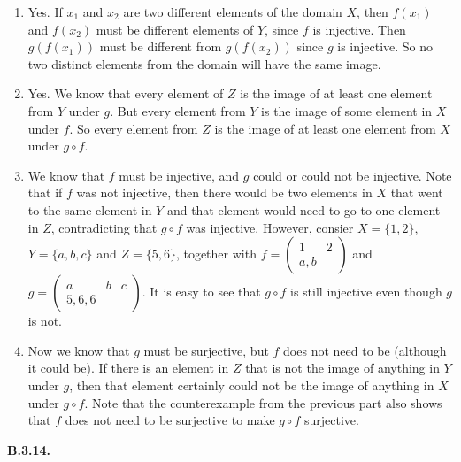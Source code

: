 \documentclass[10pt,]{book}
\theoremstyle{plain}
\theoremstyle{definition}
\theoremstyle{definition}
\theoremstyle{definition}
\theoremstyle{definition}
\numberwithin{equation}{chapter}
\newcommand{\twoline}[2]{\begin{pmatrix}#1 \\ #2 \end{pmatrix}}
\newcommand{\amp}{&}
\begin{document}
\begin{enumerate}[label=(\alph*)]
\item\hypertarget{li-633}{}\hypertarget{p-1872}{}%
Yes.  If \(x_1\) and \(x_2\) are two different elements of the domain \(X\), then \(f(x_1)\) and \(f(x_2)\) must be different elements of \(Y\), since \(f\) is injective.  Then \(g(f(x_1))\) must be different from \(g(f(x_2))\) since \(g\) is injective.  So no two distinct elements from the domain will have the same image.%
\item\hypertarget{li-634}{}\hypertarget{p-1873}{}%
Yes.  We know that every element of \(Z\) is the image of at least one element from \(Y\) under \(g\).  But every element from \(Y\) is the image of some element in \(X\) under \(f\).  So every element from \(Z\) is the image of at least one element from \(X\) under \(g\circ f\).%
\item\hypertarget{li-635}{}\hypertarget{p-1874}{}%
We know that \(f\) must be injective, and \(g\) could or could not be injective. Note that if \(f\) was not injective, then there would be two elements in \(X\) that went to the same element in \(Y\) and that element would need to go to one element in \(Z\), contradicting that \(g\circ f\) was injective. However, consier \(X = \{1,2\}\), \(Y = \{a, b, c\}\) and \(Z = \{5, 6\}\), together with \(f = \twoline{1 \amp 2}{a, b}\) and \(g = \twoline{a \amp b \amp c}{5, 6, 6}\). It is easy to see that \(g \circ f\) is still injective even though \(g\) is not.%
\item\hypertarget{li-636}{}\hypertarget{p-1875}{}%
Now we know that \(g\) must be surjective, but \(f\) does not need to be (although it could be). If there is an element in \(Z\) that is not the image of anything in \(Y\) under \(g\), then that element certainly could not be the image of anything in \(X\) under \(g\circ f\). Note that the counterexample from the previous part also shows that \(f\) does not need to be surjective to make \(g\circ f\) surjective.%
\end{enumerate}
%
\par\smallskip
\noindent\textbf{B.3.14.} \hypertarget{p-1879}{}%
\leavevmode%
\end{document}
